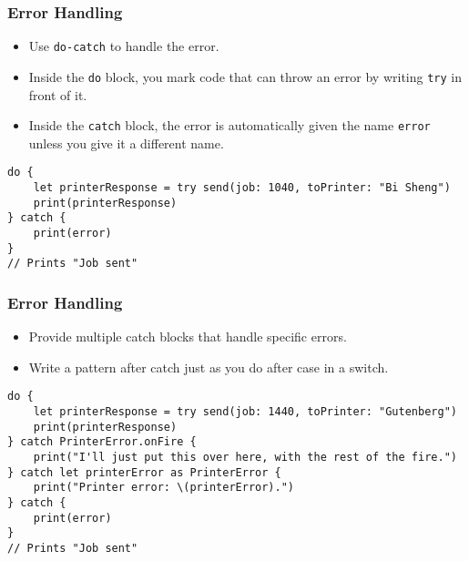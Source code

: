 \begin{frame}[fragile] \frametitle{Error Handling}

\begin{itemize}
\item Use \lstinline|do-catch| to handle the error.
\item Inside the \lstinline|do| block, you mark code that can throw an error by writing \lstinline|try| in front of it.
\item Inside the \lstinline|catch| block, the error is automatically given the name \lstinline|error| unless you give it a different name. 
\end{itemize}

\begin{lstlisting}[basicstyle=\scriptsize]
do {
    let printerResponse = try send(job: 1040, toPrinter: "Bi Sheng")
    print(printerResponse)
} catch {
    print(error)
}
// Prints "Job sent"
\end{lstlisting}


\end{frame}

\begin{frame}[fragile] \frametitle{Error Handling}

\begin{itemize}
\item Provide multiple catch blocks that handle specific errors. 
\item Write a pattern after catch just as you do after case in a switch.
\end{itemize}

\begin{lstlisting}[basicstyle=\scriptsize]
do {
    let printerResponse = try send(job: 1440, toPrinter: "Gutenberg")
    print(printerResponse)
} catch PrinterError.onFire {
    print("I'll just put this over here, with the rest of the fire.")
} catch let printerError as PrinterError {
    print("Printer error: \(printerError).")
} catch {
    print(error)
}
// Prints "Job sent"
\end{lstlisting}


\end{frame}

